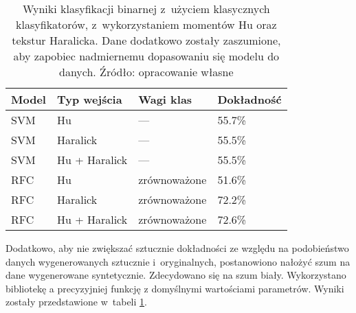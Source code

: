 \begin{table}[h]
	\centering
	\begin{threeparttable}
		\caption{Wyniki klasyfikacji binarnej z~użyciem klasycznych klasyfikatorów, z~wykorzystaniem momentów Hu oraz tekstur Haralicka. Dane dodatkowo zostały zaszumione, aby zapobiec nadmiernemu dopasowaniu się modelu do danych. Źródło: opracowanie własne}
		\label{hu.haralick.table.with.augmentation.and.noise}
		\begin{tabularx}{1\textwidth}{ |X|X|X|X| }
		  \hline
		  \textbf{Model} & \textbf{Typ wejścia} & \textbf{Wagi klas} & \textbf{Dokładność}\\

		  \hline
		  SVM & Hu & — & 55.7\%\\

		  \hline
		  SVM & Haralick & — & 55.5\%\\

		  \hline
		  SVM & Hu + Haralick & — & 55.5\%\\

		  \hline
		  RFC & Hu & zrównoważone & 51.6\%\\

		  \hline
  		  RFC & Haralick & zrównoważone & 72.2\%\\
  		  
		  \hline
  		  RFC & Hu + Haralick & zrównoważone & 72.6\%\\
  		  
		  \hline
		\end{tabularx}
	\end{threeparttable}
\end{table}
Dodatkowo, aby nie zwiększać sztucznie dokładności ze względu na podobieństwo danych wygenerowanych sztucznie i~oryginalnych, postanowiono nałożyć szum na dane wygenerowane syntetycznie. Zdecydowano się na szum biały. Wykorzystano bibliotekę  a precyzyjniej funkcję  z domyślnymi wartościami parametrów. Wyniki zostały przedstawione w~tabeli \ref{hu.haralick.table.with.augmentation.and.noise}.

